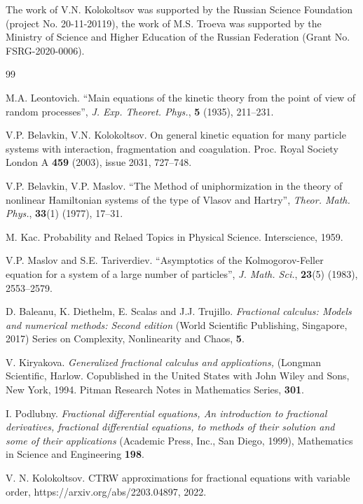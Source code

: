 \documentclass[12pt]{article}
\numberwithin{equation}{section}
\begin{document}
The work of V.N. Kolokoltsov was supported by the Russian Science Foundation (project No. 20-11-20119),
the work of M.S. Troeva was supported by the Ministry of Science and Higher Education of the Russian Federation (Grant No. FSRG-2020-0006).

\begin{thebibliography}{99}

 M.A. Leontovich. ``Main equations of the kinetic theory from the point of view
of random processes'', {\it J. Exp. Theoret. Phys.}, {\bf 5} (1935), 211--231.

V.P. Belavkin, V.N. Kolokoltsov.
On general kinetic equation for many particle systems with
interaction, fragmentation and coagulation. Proc. Royal Society
London A {\bf 459} (2003), issue 2031, 727--748.

V.P. Belavkin, V.P. Maslov. ``The Method of uniphormization in the theory of
nonlinear Hamiltonian systems of the type of Vlasov and Hartry'', {\it Theor. Math. Phys.}, {\bf 33}(1) (1977), 17--31.

 M. Kac. Probability and Relaed Topics in Physical Science. Interscience, 1959.

V.P. Maslov and S.E. Tariverdiev. ``Asymptotics of the Kolmogorov-Feller 
equation for a system of a large number of particles'', {\it J. Math. Sci.}, {\bf 23}(5) (1983), 2553--2579.

D. Baleanu, K. Diethelm, E. Scalas and J.J.  Trujillo. {\it Fractional calculus: Models and numerical methods: Second edition}
(World Scientific Publishing, Singapore, 2017) Series on Complexity, Nonlinearity and Chaos, {\bf 5}.

 V. Kiryakova. {\it Generalized fractional calculus and applications,}
(Longman Scientific, Harlow. Copublished in the United States with John Wiley and Sons, New York, 1994.
 Pitman Research Notes in Mathematics Series, {\bf 301}.

I. Podlubny.
{\it Fractional differential equations, An introduction to fractional derivatives,
	fractional differential equations, to methods of their solution and some of their applications}
(Academic Press, Inc., San Diego, 1999), Mathematics in Science and Engineering {\bf 198}.

 V. N. Kolokoltsov.
CTRW approximations for fractional equations with variable order, https://arxiv.org/abs/2203.04897, 2022.


\end{thebibliography}
\end{document}
